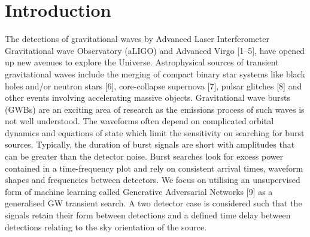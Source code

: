 \documentclass[%
 reprint,
 amsmath,amssymb,
 aps,
]{revtex4-2}
\begin{document}

\section{Introduction}

The detections of gravitational waves by Advanced Laser Interferometer Gravitational wave Observatory (aLIGO) and Advanced Virgo [1–5], have opened up new avenues to explore the Universe. Astrophysical sources of transient gravitational waves include the merging of compact binary star systems like black holes and/or neutron stars [6], core-collapse supernova [7], pulsar glitches [8] and other events involving accelerating massive objects.
Gravitational wave bursts (GWBs) are an exciting area of research as the emissions process of such waves is not well understood. The waveforms often depend on complicated orbital dynamics and equations of state which limit the sensitivity on searching for burst sources. Typically, the duration of burst signals are short with amplitudes that can be greater than the detector noise. Burst searches look for excess power contained in a time-frequency plot and rely on consistent arrival times, waveform shapes and frequencies between detectors. We focus on utilising an unsupervised form of machine learning called Generative Adversarial Networks [9] as a generalised GW transient search. A two detector case is considered such that the signals retain their form between detections and a defined time delay between detections relating to the sky orientation of the source.
\end{document}

